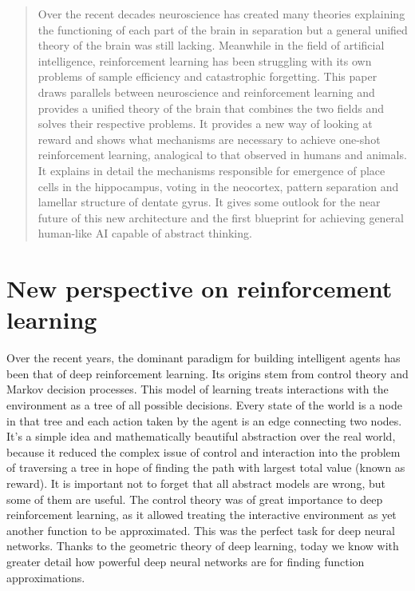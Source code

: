 \documentclass[12pt]{article}
\begin{document}
\maketitle
\lstset{
	basicstyle=\ttfamily,
	mathescape
}

\begin{abstract}
	Over the recent decades neuroscience has created many theories explaining the functioning of each part of the brain in separation but a general unified theory of the brain was
	still lacking. Meanwhile in the field of artificial intelligence, reinforcement learning has been struggling with its own problems of sample efficiency
	and catastrophic forgetting. This paper draws parallels between neuroscience and reinforcement learning and provides a unified theory of the brain
	that combines the two fields and solves their respective problems. It provides a new way of looking at reward and shows what mechanisms are necessary to achieve one-shot reinforcement learning, analogical to that observed in humans and animals. It explains in detail the mechanisms responsible for emergence of place cells in the hippocampus, voting in the neocortex, pattern separation and lamellar structure of dentate gyrus. It gives some outlook for the near future of this new architecture
	and the first blueprint for achieving general human-like AI capable of abstract thinking.
\end{abstract}

\section{New perspective on reinforcement learning}


Over the recent years, the dominant paradigm for building intelligent agents has been that of deep reinforcement learning. Its origins stem from control theory and Markov decision processes. This model of learning treats interactions with the environment as a tree of all possible decisions. Every state of the world is a node in that tree and each action taken by the agent is an edge connecting two nodes. It's a simple idea and mathematically beautiful abstraction over the real world, because it reduced the complex issue of control and interaction into the problem of traversing a tree in hope of finding the path with largest total value (known as reward). It is important not to forget that all abstract models are wrong, but some of them are useful. The control theory was
of great importance to deep reinforcement learning, as it allowed treating the interactive environment as yet another function to be approximated. This was the perfect task for deep neural networks. Thanks to the geometric theory of deep learning, today we know with greater detail how powerful deep neural networks are for finding function approximations.
\end{document}
